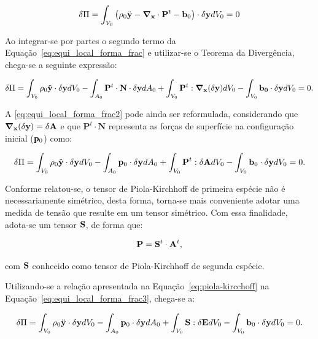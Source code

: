\begin{align}
	\delta\Pi = \int_{V_0} \left(\rho_0 \ddot{\mathbf{y}} - \boldsymbol{\nabla}_{\mathbf{x}} \cdot \mathbf{P}^t -  \mathbf{b}_0 \right) \cdot  \delta\mathbf{y} dV_0 = 0 \label{eq:equi_local_forma_frac}
\end{align}

Ao integrar-se por partes o segundo termo da Equação~\eqref{eq:equi_local_forma_frac} e utilizar-se o Teorema da Divergência, chega-se a seguinte expressão:

\begin{align}
	\delta\Pi = \int_{V_0} \rho_0 \ddot{\mathbf{y}} \cdot \delta\mathbf{y} dV_0 - \int_{A_0} \mathbf{P}^t \cdot \mathbf{N} \cdot  \delta\mathbf{y} dA_0  + \int_{V_0} \mathbf{P}^t : \boldsymbol{\nabla}_{\mathbf{x}}(\delta\mathbf{y}) dV_0 - \int_{V_0} \mathbf{b_0} \cdot \delta \mathbf{y} dV_0 = 0. \label{eq:equi_local_forma_frac2}
\end{align}

A \autoref {eq:equi_local_forma_frac2} pode ainda ser reformulada, considerando que $\boldsymbol{\nabla}_{\mathbf{x}} (\delta\mathbf{y}) = \delta \mathbf{A}$ e que $\mathbf{P}^t \cdot \mathbf{N}$ representa as forças de superfície na configuração inicial ($\mathbf{p}_{0}$) como:

\begin{align}
	\delta\Pi = \int_{V_{0}} \rho_{0} \ddot{\mathbf{y}} \cdot \delta\mathbf{y} dV_{0} - \int_{A_{0}} \mathbf{p}_{0} \cdot \delta\mathbf{y} dA_{0} + \int_{V_{0}} \mathbf{P}^{t} : \delta\mathbf{A} dV_{0} - \int_{V_{0}}  \mathbf{b}_0 \cdot \delta\mathbf{y} dV_{0} = 0. \label{eq:equi_local_forma_frac3}
\end{align}

Conforme relatou-se, o tensor de Piola-Kirchhoff de primeira espécie não é necessariamente simétrico, desta forma, torna-se mais conveniente adotar uma medida de tensão que resulte em um tensor simétrico. Com essa finalidade, adota-se um tensor $\mathbf{S}$, de forma que:

\begin{align}
	\mathbf{P} = \mathbf{S}^{t} \cdot \mathbf{A}^{t}, \label{eq:piola-kircchoff}
\end{align}

\noindent com $\mathbf{S}$ conhecido como tensor de Piola-Kirchhoff de segunda espécie. 

Utilizando-se a relação apresentada na Equação~\eqref{eq:piola-kircchoff} na Equação~\eqref{eq:equi_local_forma_frac3}, chega-se a:

\begin{align}
	\delta\Pi = \int_{V_{0}} \rho_{0} \ddot{\mathbf{y}} \cdot \delta\mathbf{y} dV_{0} - \int_{A_{0}} \mathbf{p}_{0} \cdot \delta\mathbf{y} dA_{0} +  \int_{V_{0}} \mathbf{S} : \delta\mathbf{E} dV_{0} - \int_{V_{0}}  \mathbf{b}_0 \cdot \delta\mathbf{y} dV_{0} = 0.
	\label{eq:equi_local_forma_final0}
\end{align}

